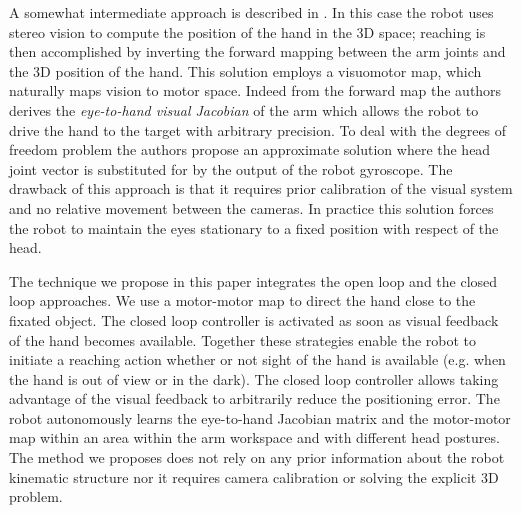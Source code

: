A somewhat intermediate approach is described in \cite{scaz07fast}. In 
this case the robot uses stereo vision to compute the position
of the hand in the 3D space; reaching is then accomplished by inverting the 
forward mapping between the arm joints and the 3D position of the hand. This 
solution employs a visuomotor map, which naturally maps vision to motor space. 
Indeed from the forward map the authors derives the {\em eye-to-hand visual 
Jacobian} of the arm which allows the robot to drive the hand to the target with 
arbitrary precision. To deal with the degrees of freedom problem the authors
propose an approximate solution where the head joint vector is substituted 
for by the output of the robot gyroscope. The drawback of this approach is that 
it requires prior calibration of the visual system and no relative movement 
between the cameras. In practice this solution forces the robot to maintain 
the eyes stationary to a fixed position with respect of the head. 

The technique we propose in this paper integrates the open loop and the 
closed loop approaches. We use a motor-motor map to direct 
the hand close to the fixated object. The closed loop controller is activated 
as soon as visual feedback of the hand becomes available. Together 
these strategies enable the robot to initiate a reaching action whether or not 
sight of the hand is available (e.g. when the hand is 
out of view or in the dark). The closed loop controller allows taking
advantage of the visual feedback to arbitrarily reduce the positioning
error. The robot autonomously learns the eye-to-hand Jacobian matrix and 
the motor-motor map within an area within the arm workspace and with different
head postures. The method we proposes does not rely on any prior information
about the robot kinematic structure nor it requires camera calibration 
or solving the explicit 3D problem.
